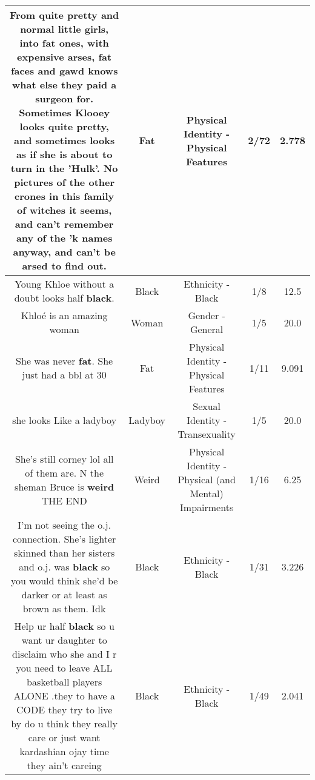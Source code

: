 \documentclass[11pt]{article}
\newlength\mylength
\begin{document}
\begin{center}
\begin{longtable}{|C{.65\mylength}|C{.30\mylength}|C{.12\mylength}|C{.12\mylength}|C{.12\mylength}|}
  \small From quite pretty and normal little girls, into \textbf{fat} ones, with expensive arses, \textbf{fat} faces and gawd knows what else they paid a surgeon for. Sometimes Klooey looks quite pretty, and sometimes looks as if she is about to turn in the 'Hulk'. No pictures of the other crones in this family of witches it seems, and can't remember any of the 'k names anyway, and can't be arsed to find out.\normalsize   & Fat & Physical Identity - Physical Features & 2/72 & 2.778 \\  \hline
  \small Young Khloe without a doubt looks half \textbf{black}.\normalsize   & Black & Ethnicity - Black & 1/8 & 12.5 \\  \hline
  \small Khloé is an amazing woman\normalsize   & Woman & Gender - General & 1/5 & 20.0 \\  \hline
  \small She was never \textbf{fat}. She just had a bbl at 30\normalsize   & Fat & Physical Identity - Physical Features & 1/11 & 9.091 \\  \hline
  \small she looks Like a ladyboy\normalsize   & Ladyboy & Sexual Identity - Transexuality & 1/5 & 20.0 \\  \hline
  \small She's still corney lol all of them are. N the sheman Bruce is \textbf{weird} THE END\normalsize   & Weird & Physical Identity - Physical (and Mental) Impairments & 1/16 & 6.25 \\  \hline
  \small I'm not seeing the o.j. connection. She's lighter skinned than her sisters and o.j. was \textbf{black} so you would think she'd be darker or at least as brown as them. Idk\normalsize   & Black & Ethnicity - Black & 1/31 & 3.226 \\  \hline
  \small Help ur half \textbf{black} so u want ur daughter to disclaim who she and I r   you need to leave ALL basketball players ALONE .they to have a CODE they try to live by do u think they really care or just want kardashian ojay  time they ain't careing\normalsize   & Black & Ethnicity - Black & 1/49 & 2.041 \\  \hline

\end{longtable}
\end{center}
\end{document}
